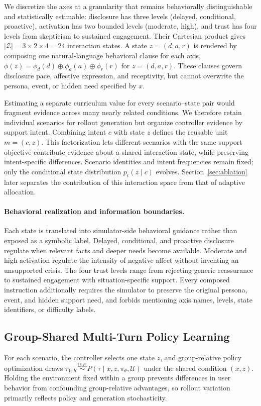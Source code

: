 \documentclass[letterpaper]{article}
\begin{document}
We discretize the axes at a granularity that remains behaviorally distinguishable and statistically estimable: disclosure has three levels (delayed, conditional, proactive), activation has two bounded levels (moderate, high), and trust has four levels from skepticism to sustained engagement. Their Cartesian product gives $|\mathcal Z|=3\times2\times4=24$ interaction states. A state $z=(d,a,r)$ is rendered by composing one natural-language behavioral clause for each axis,
$\phi(z)=\phi_d(d)\oplus\phi_a(a)\oplus\phi_r(r)$ for $z=(d,a,r)$.
These clauses govern disclosure pace, affective expression, and receptivity, but cannot overwrite the persona, event, or hidden need specified by $x$.

Estimating a separate curriculum value for every scenario--state pair would fragment evidence across many nearly related conditions. We therefore retain individual scenarios for rollout generation but organize controller evidence by support intent. Combining intent $c$ with state $z$ defines the reusable unit $m=(c,z)$. This factorization lets different scenarios with the same support objective contribute evidence about a shared interaction state, while preserving intent-specific differences. Scenario identities and intent frequencies remain fixed; only the conditional state distribution $p_t(z\mid c)$ evolves. Section~\ref{sec:ablation} later separates the contribution of this interaction space from that of adaptive allocation.

\paragraph{Behavioral realization and information boundaries.}
Each state is translated into simulator-side behavioral guidance rather than exposed as a symbolic label. Delayed, conditional, and proactive disclosure regulate when relevant facts and deeper needs become available. Moderate and high activation regulate the intensity of negative affect without inventing an unsupported crisis. The four trust levels range from rejecting generic reassurance to sustained engagement with situation-specific support. Every composed instruction additionally requires the simulator to preserve the original persona, event, and hidden support need, and forbids mentioning axis names, levels, state identifiers, or difficulty labels.

\subsection{Group-Shared Multi-Turn Policy Learning}
For each scenario, the controller selects one state $z$, and group-relative policy optimization draws $\tau_{1:K}\overset{\mathrm{i.i.d.}}{\sim}P(\tau\mid x,z,\pi_\theta,\mathcal U)$ under the shared condition $(x,z)$. Holding the environment fixed within a group prevents differences in user behavior from confounding group-relative advantages, so rollout variation primarily reflects policy and generation stochasticity.
\end{document}
